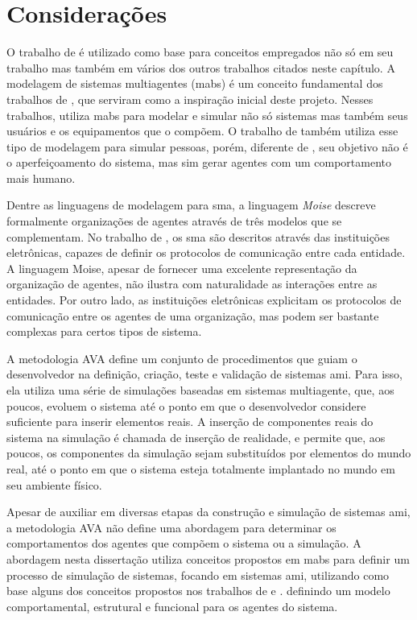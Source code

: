 \section{Considerações}

O trabalho de  é utilizado como base para conceitos empregados não só em seu trabalho mas também em vários dos outros trabalhos citados neste capítulo. A modelagem de sistemas multiagentes (\acrshort{mabs}) é um conceito fundamental dos trabalhos de , que serviram como a inspiração inicial deste projeto. Nesses trabalhos,  utiliza \acrshort{mabs} para modelar e simular não só sistemas mas também seus usuários e os equipamentos que o compõem. O trabalho de  também utiliza esse tipo de modelagem para simular pessoas, porém, diferente de , seu objetivo não é o aperfeiçoamento do sistema, mas sim gerar agentes com um comportamento mais humano.

Dentre as linguagens de modelagem para \acrshort{sma}, a linguagem \textit{Moise} \cite{hubner2002model, hubner2007developing} descreve formalmente organizações de agentes através de três modelos que se complementam. No trabalho de , os \acrshort{sma} são descritos através das instituições eletrônicas, capazes de definir os protocolos de comunicação entre cada entidade. A linguagem Moise, apesar de fornecer uma excelente representação da organização de agentes, não ilustra com naturalidade as interações entre as entidades. Por outro lado, as instituições eletrônicas explicitam os protocolos de comunicação entre os agentes de uma organização, mas podem ser bastante complexas para certos tipos de sistema. 

A metodologia AVA \cite{garcia2010human} define um conjunto de procedimentos que guiam o desenvolvedor na definição, criação, teste e validação de sistemas \acrshort{ami}. Para isso, ela utiliza uma série de simulações baseadas em sistemas multiagente, que, aos poucos, evoluem o sistema até o ponto em que o desenvolvedor considere suficiente para inserir elementos reais. A inserção de componentes reais do sistema na simulação é chamada de inserção de realidade, e permite que, aos poucos,  os componentes da simulação sejam substituídos por elementos do mundo real, até o ponto em que o sistema esteja totalmente implantado no mundo em seu ambiente físico.

Apesar de auxiliar em diversas etapas da construção e simulação de sistemas \acrshort{ami}, a metodologia AVA não define uma abordagem para determinar os comportamentos dos agentes que compõem o sistema ou a simulação. A abordagem nesta dissertação utiliza conceitos propostos em \acrshort{mabs} para definir um processo de simulação de sistemas, focando em sistemas \acrshort{ami}, utilizando como base alguns dos conceitos propostos nos trabalhos de  e . definindo um modelo comportamental, estrutural e funcional para os agentes do sistema. 


